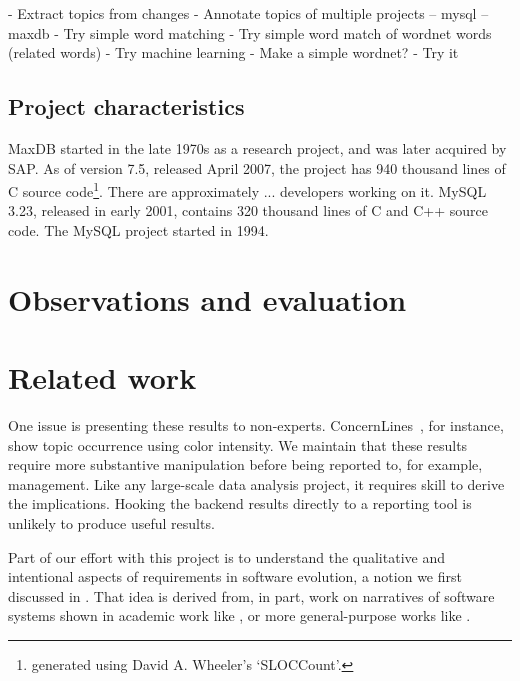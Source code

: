 \documentclass[10pt, conference, compsocconf]{IEEEtran}
\begin{document}
- Extract topics from changes
- Annotate topics of multiple projects
-- mysql
-- maxdb
- Try simple word matching
- Try simple word match of wordnet words (related words)
- Try machine learning
- Make a simple wordnet?
- Try it
\subsection{Project characteristics}
MaxDB started in the late 1970s as a research project, and was later acquired by SAP. As of version 7.5, released April 2007, the project has 940 thousand lines of C source code\footnote{generated using David A. Wheeler's `SLOCCount'.}. There are approximately ... developers working on it. MySQL 3.23, released in early 2001, contains 320 thousand lines of C and C++ source code. The MySQL project started in 1994.

\section{Observations and evaluation}

\section{Related work}

One issue is presenting these results to non-experts. ConcernLines~\cite{treude09cl}, for instance, show topic occurrence using color intensity. We maintain that these results require more substantive manipulation before being reported to, for example, management. Like any large-scale data analysis project, it requires skill to derive the implications. Hooking the backend results directly to a reporting tool is unlikely to produce useful results. 

Part of our effort with this project is to understand the qualitative and intentional aspects of requirements in software evolution, a notion we first discussed in \cite{ernst07icsm}. That idea is derived from, in part, work on narratives of software systems shown in academic work like \cite{anton01}, or more general-purpose works like \cite{waldo93}.
\end{document}
